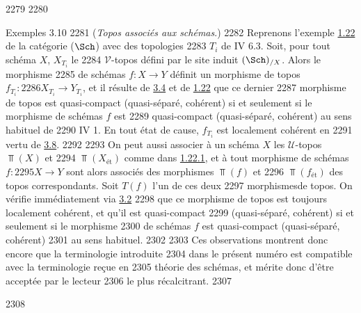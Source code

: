   2279	
  2280	\begin{enonce*}[remark]{Exemples 3.10}
  2281	(\emph{Topos associés aux schémas}.)
  2282	Reprenons l'exemple \hyperref[VI.subsec1.22]{1.22} de la catégorie ($\Sch$) avec des topologies
  2283	$T_i$ de \SGA IV 6.3. Soit, pour tout schéma $X$, $X_{T_i}$ le
  2284	$𝒱$-topos défini par le site induit $(\Sch)_{/X}$. Alors le morphisme
  2285	de schémas $f : X \to Y$ définit un morphisme de topos $f_{T_i} :
  2286	X_{T_i} \to Y_{T_i}$, et il résulte de \hyperref[VI.prop3.4]{3.4} et de \hyperref[VI.subsec1.22]{1.22} que ce dernier
  2287	morphisme de topos est quasi-compact (\resp quasi-séparé, 	cohérent) si et seulement si le morphisme de schémas $f$ est
  2289	quasi-compact (\resp quasi-séparé, \resp cohérent) au sens habituel de
  2290	\EGA IV 1. En tout état de cause, $f_{T_i}$ est localement cohérent en
  2291	vertu de \hyperref[VI.cor3.8]{3.8}.
  2292	
  2293	On peut aussi associer à un schéma $X$ les $𝒰$-topos $\Top(X)$ et
  2294	$\Top(X_{\text{ét}})$ comme dans \hyperref[VI.subsubsec1.22.1]{1.22.1}, et à tout morphisme de schémas $f :
  2295	X \to Y$ sont alors associés des morphismes $\Top(f)$ et
  2296	$\Top(f_{\text{ét}})$ des topos correspondants. Soit $T(f)$ l'un de ces deux
  2297	morphismes\pageoriginale de topos. On vérifie immédiatement via \hyperref[VI.prop3.2]{3.2}
  2298	que ce morphisme de topos est toujours localement cohérent, et qu'il est quasi-compact
  2299	(\resp quasi-séparé, \resp cohérent) si et seulement si le morphisme
  2300	de schémas $f$ est quasi-compact (\resp quasi-séparé, \resp cohérent)
  2301	au sens habituel.
  2302	
  2303	Ces observations montrent donc encore que la terminologie introduite
  2304	dans le présent numéro est compatible avec la terminologie reçue en
  2305	théorie des schémas, et mérite donc d'être acceptée par le lecteur
  2306	le plus récalcitrant.
  2307	\end{enonce*}
  2308	
